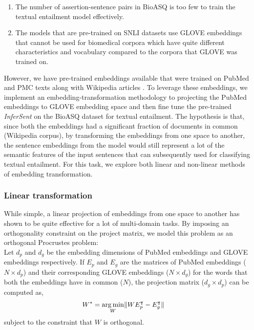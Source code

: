 \begin{enumerate}
    \item The number of assertion-sentence pairs in BioASQ is too few to train the textual entailment model effectively.
    \item The models that are pre-trained on SNLI \cite{snli}
    datasets use GLOVE \cite{glove} embeddings that cannot be used for biomedical corpora which have quite different characteristics and vocabulary compared to the corpora that GLOVE was trained on.
\end{enumerate}

However, we have pre-trained embeddings available that were trained on PubMed and PMC texts along with Wikipedia articles \cite{biomed_embed}. To leverage these embeddings, we implement an embedding-transformation methodology to projecting the PubMed embeddings to GLOVE embedding space and then fine tune the pre-trained \textit{InferSent} on the BioASQ dataset for textual entailment. The hypothesis is that, since both the embeddings had a significant fraction of documents in common (Wikipedia corpus), by transforming the embeddings from one space to another, the sentence embeddings from the model would still represent a lot of the semantic features of the input sentences that can subsequently used for classifying textual entailment. For this task, we explore both linear and non-linear methods of embedding transformation.

\subsubsection*{Linear transformation}

While simple, a linear projection of embeddings from one space to another has shown to be quite effective for a lot of multi-domain tasks. By imposing an orthogonality constraint on the project matrix, we model this problem as an orthogonal Procrustes problem: \\

Let $d_p$ and $d_g$ be the embedding dimensions of PubMed embeddings and GLOVE embeddings respectively.
If $E_p$ and $E_g$ are the matrices of PubMed embeddings ($N \times d_p$) and their corresponding GLOVE embeddings ($N \times d_g$) for the words that both the embeddings have in common ($N$), the projection matrix ($d_g \times d_p$) can be computed as,
\begin{align*}
    W^* &= \operatorname*{arg\,min}_W \lVert  W E_p^{\intercal} - E_g^{\intercal} \rVert
\end{align*}
subject to the constraint that $W$ is orthogonal.

